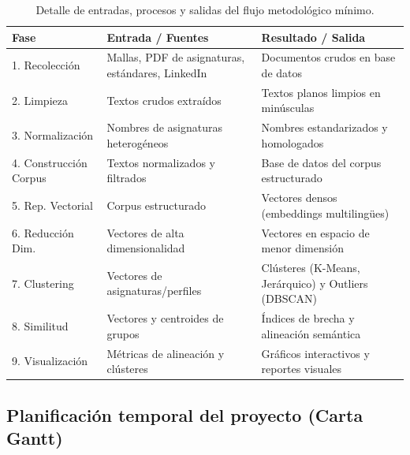 \begin{table}[H]
    \centering
    \small
    \renewcommand{\baselinestretch}{1.0}\selectfont
    \caption{Detalle de entradas, procesos y salidas del flujo metodológico mínimo.}
    \label{tab:flujo_metodologico_detalle}
    \captionsetup{skip=8pt}
    \begin{tabularx}{\textwidth}{l >{\raggedright\arraybackslash}X >{\raggedright\arraybackslash}X}
        \toprule
        \textbf{Fase} & \textbf{Entrada / Fuentes} & \textbf{Resultado / Salida} \\
        \midrule
        1. Recolección & Mallas, PDF de asignaturas, estándares, LinkedIn & Documentos crudos en base de datos \\
        2. Limpieza & Textos crudos extraídos & Textos planos limpios en minúsculas \\
        3. Normalización & Nombres de asignaturas heterogéneos & Nombres estandarizados y homologados \\
        4. Construcción Corpus & Textos normalizados y filtrados & Base de datos del corpus estructurado \\
        5. Rep. Vectorial & Corpus estructurado & Vectores densos (embeddings multilingües) \\
        6. Reducción Dim. & Vectores de alta dimensionalidad & Vectores en espacio de menor dimensión \\
        7. Clustering & Vectores de asignaturas/perfiles & Clústeres (K-Means, Jerárquico) y Outliers (DBSCAN) \\
        8. Similitud & Vectores y centroides de grupos & Índices de brecha y alineación semántica \\
        9. Visualización & Métricas de alineación y clústeres & Gráficos interactivos y reportes visuales \\
        \bottomrule
    \end{tabularx}
\end{table}

\subsection{Planificación temporal del proyecto (Carta Gantt)}
\label{app:gantt}


